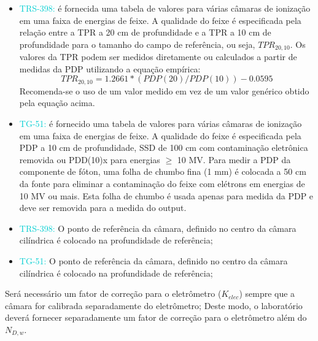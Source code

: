 \documentclass[11pt,a4paper]{article}
\newcounter{exemplo}
\begin{document}
	\begin{exemplo}
		\begin{itemize}
			\item \textcolor{DarkTurquoise}{TRS-398:} é fornecida uma tabela de valores para várias câmaras de ionização em uma faixa de energias de feixe. A qualidade do feixe é especificada pela relação entre a TPR a 20 cm de profundidade e a TPR a 10 cm de profundidade para o tamanho do campo de referência, ou seja, $TPR_{20,10}$. Os valores da TPR podem ser medidos diretamente ou calculados a partir de medidas da PDP utilizando a equação empírica: $$TPR_{20,10} = 1.2661* (PDP(20)/PDP(10)) - 0.0595$$ Recomenda-se o uso de um valor medido em vez de um valor genérico obtido pela equação acima.
			

			\item \textcolor{DarkTurquoise}{TG-51:} é fornecido uma tabela de valores para várias câmaras de ionização em uma faixa de energias de feixe. A qualidade do feixe é especificada pela PDP a 10 cm de profundidade, SSD de 100 cm com contaminação eletrônica removida ou PDD(10)x para energias $\geq$ 10 MV. Para medir a PDP da componente de fóton, uma folha de chumbo fina (1 mm) é colocada a 50 cm da fonte para eliminar a contaminação do feixe com elétrons em energias de 10 MV ou mais. Esta folha de chumbo é usada apenas para medida da PDP e deve ser removida para a medida do output.
		\end{itemize}
	\end{exemplo}

	\begin{exemplo}
		\begin{itemize}
			\item \textcolor{DarkTurquoise}{TRS-398:} O ponto de referência da câmara, definido no centro da câmara cilíndrica é colocado na profundidade de referência;
			
			\item \textcolor{DarkTurquoise}{TG-51:} O ponto de referência da câmara, definido no centro da câmara cilíndrica é colocado na profundidade de referência;
		\end{itemize}
	\end{exemplo}

	\begin{exemplo}
		Será necessário um fator de correção para o eletrômetro ($K_{elec}$) sempre que a câmara for calibrada separadamente do eletrômetro; Deste modo, o laboratório deverá fornecer separadamente um fator de correção para o eletrômetro além do $N_{D,w}$. 
	\end{exemplo}
\end{document}
